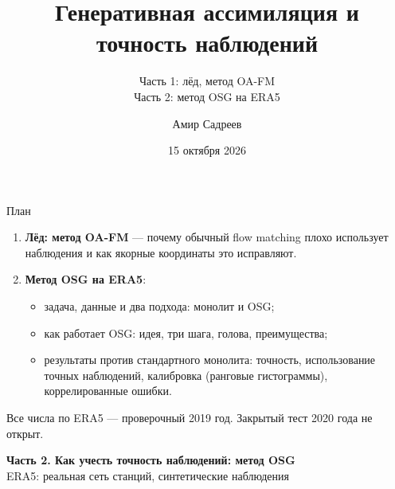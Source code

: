 \documentclass[10pt,aspectratio=169]{beamer}
\title{Генеративная ассимиляция и точность наблюдений}
\subtitle{Часть 1: лёд, метод OA-FM\\ Часть 2: метод OSG на ERA5}
\author{Амир Садреев}
\date{15 октября 2026}
\begin{document}
\begin{frame}
\titlepage
\end{frame}

\begin{frame}{План}
\begin{enumerate}
\item \textbf{Лёд: метод OA-FM} --- почему обычный flow matching плохо использует наблюдения и как якорные координаты это исправляют.
\item \textbf{Метод OSG на ERA5}:
  \begin{itemize}
  \item задача, данные и два подхода: монолит и OSG;
  \item как работает OSG: идея, три шага, голова, преимущества;
  \item результаты против стандартного монолита: точность, использование точных наблюдений, калибровка (ранговые гистограммы), коррелированные ошибки.
  \end{itemize}
\end{enumerate}
\vspace{3mm}
{\small\color{ink} Все числа по ERA5 --- проверочный 2019 год. Закрытый тест 2020 года не открыт.}
\end{frame}



\begin{frame}[plain]
\vfill
\begin{center}
{\Large\bfseries Часть 2. Как учесть точность наблюдений: метод OSG}\\[4mm]
{\color{ink} ERA5: реальная сеть станций, синтетические наблюдения}
\end{center}
\vfill
\end{frame}
\end{document}
